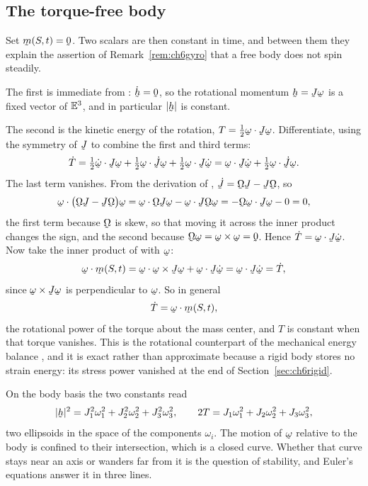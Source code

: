 \subsection*{The torque-free body}

Set $\bm(S,t)=\bze$. Two scalars are then constant in time, and between
them they explain the assertion of Remark~\ref{rem:ch6gyro} that a free
body does not spin steadily.

The first is immediate from : $\dot{\bh}=\bze$, so the
rotational momentum $\bh=\vek{J}\bom$ is a fixed vector of $\mathbb{E}^{3}$, and in
particular $|\bh|$ is constant.

The second is the kinetic energy of the rotation,
$T=\tfrac12\ip\bom{\vek{J}\bom}$. Differentiate, using the symmetry of
$\vek{J}$ to combine the first and third terms:
\[
   \dot T=\tfrac12\ip{\dot\bom}{\vek{J}\bom}
   +\tfrac12\ip{\bom}{\dot{\vek{J}}\bom}
   +\tfrac12\ip{\bom}{\vek{J}\dot\bom}
   =\ip{\bom}{\vek{J}\dot\bom}
   +\tfrac12\ip{\bom}{\dot{\vek{J}}\bom} .
\]
The last term vanishes. From the derivation of ,
$\dot{\vek{J}}=\bOm\vek{J}-\vek{J}\bOm$, so
\[
   \ip{\bom}{\big(\bOm\vek{J}-\vek{J}\bOm\big)\bom}
   =\ip{\bom}{\bOm\vek{J}\bom}-\ip{\bom}{\vek{J}\bOm\bom}
   =-\ip{\bOm\bom}{\vek{J}\bom}-0=0 ,
\]
the first term because $\bOm$ is skew, so that moving it across the
inner product changes the sign, and the second because
$\bOm\bom=\bom\times\bom=\bze$. Hence
$\dot T=\ip\bom{\vek{J}\dot\bom}$. Now take the inner product of
 with $\bom$:
\[
   \ip\bom{\bm(S,t)}=\ip\bom{\bom\times\vek{J}\bom}
   +\ip\bom{\vek{J}\dot\bom}=\ip\bom{\vek{J}\dot\bom}=\dot T ,
\]
since $\bom\times\vek{J}\bom$ is perpendicular to $\bom$. So in general
\[
   \dot T=\ip{\bom}{\bm(S,t)} ,
\]
the rotational power of the torque about the mass center, and $T$ is
constant when that torque vanishes. This is the rotational counterpart
of the mechanical energy balance , and it is exact rather
than approximate because a rigid body stores no strain energy: its
stress power vanished at the end of Section~\ref{sec:ch6rigid}.

On the body basis the two constants read
\[
   |\bh|^{2}=J_{1}^{2}\omega_{1}^{2}+J_{2}^{2}\omega_{2}^{2}
   +J_{3}^{2}\omega_{3}^{2} ,
   \qquad
   2T=J_{1}\omega_{1}^{2}+J_{2}\omega_{2}^{2}+J_{3}\omega_{3}^{2} ,
\]
two ellipsoids in the space of the components $\omega_{i}$. The motion
of $\bom$ relative to the body is confined to their intersection, which
is a closed curve. Whether that curve stays near an axis or wanders far
from it is the question of stability, and Euler's equations answer it in
three lines.

